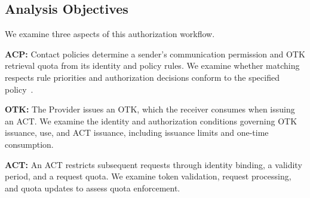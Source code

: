 \subsection{Analysis Objectives}
\label{subsec:analysis-objectives-assumptions}

We examine three aspects of this authorization workflow.

\textbf{ACP:} Contact policies determine a sender's communication permission and OTK retrieval quota from its identity and policy rules. We examine whether matching respects rule priorities and authorization decisions conform to the specified policy~\cite{syros2025sagaV2,sagaReferenceImpl2026}.

\textbf{OTK:} The Provider issues an OTK, which the receiver consumes when issuing an ACT. We examine the identity and authorization conditions governing OTK issuance, use, and ACT issuance, including issuance limits and one-time consumption.

\textbf{ACT:} An ACT restricts subsequent requests through identity binding, a validity period, and a request quota. We examine token validation, request processing, and quota updates to assess quota enforcement.
